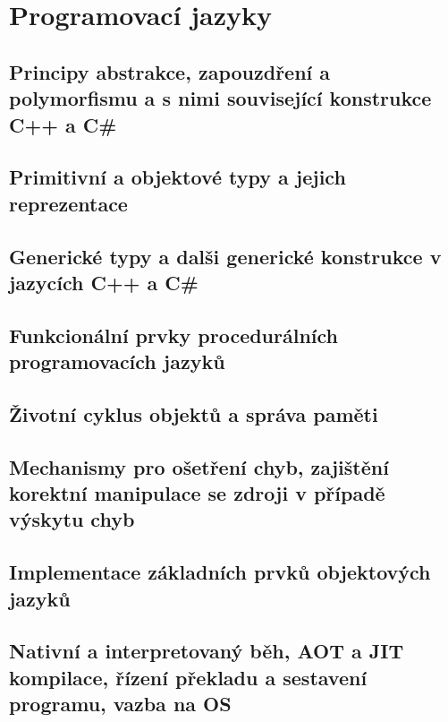 \documentclass[../../main.tex]{subfiles}
\begin{document}
\section{Programovací jazyky}

\subsection{Principy abstrakce, zapouzdření a polymorfismu a s nimi související konstrukce C++ a C\#}
\subsection{Primitivní a objektové typy a jejich reprezentace}
\subsection{Generické typy a dalši generické konstrukce v jazycích C++ a C\#}
\subsection{Funkcionální prvky procedurálních programovacích jazyků}
\subsection{Životní cyklus objektů a správa paměti}
\subsection{Mechanismy pro ošetření chyb, zajištění korektní manipulace se zdroji v případě výskytu chyb}
\subsection{Implementace základních prvků objektových jazyků}
\subsection{Nativní a interpretovaný běh, AOT a JIT kompilace, řízení překladu a sestavení programu, vazba na OS}
\end{document}
